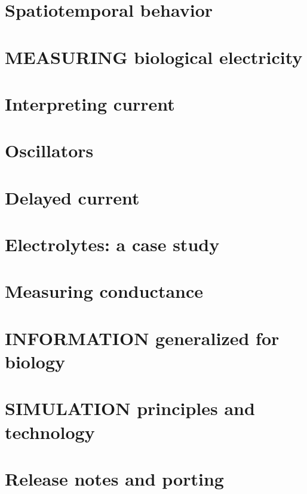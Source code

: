 \let\mypdfximage\pdfximage\def\pdfximage{\immediate\mypdfximage}\documentclass[twoside]{book}
\newcommand{\+}{\discretionary{\mbox{\scriptsize$\hookleftarrow$}}{}{}}
\begin{document}
\chapter{Spatiotemporal behavior}
\label{PHYSICS_SPATIOTEMPORAL_PAGE}

\chapter{MEASURING biological electricity}
\label{PHYSICS_MEASURING_MAIN_PAGE}

\chapter{Interpreting current}
\label{MEASURING_CURRENT_PAGE}

\chapter{Oscillators}
\label{PHYSICS_MEASURING_OSCILLATOR_PAGE}

\chapter{Delayed current}
\label{PHYSICS_MEASURING_DELAY_PAGE}

\chapter{Electrolytes\+: a case study}
\label{MEASURING_ELECTROLITES_PAGE}

\chapter{Measuring conductance}
\label{MEASURING_CONDUCTANCE_PAGE}

\chapter{INFORMATION generalized for biology}
\label{INFORMATION_MAIN_PAGE}

\chapter{SIMULATION principles and technology}
\label{SIMULATION_MAIN_PAGE}

\chapter{Release notes and porting}
\label{ReleaseNotes}

\end{document}
